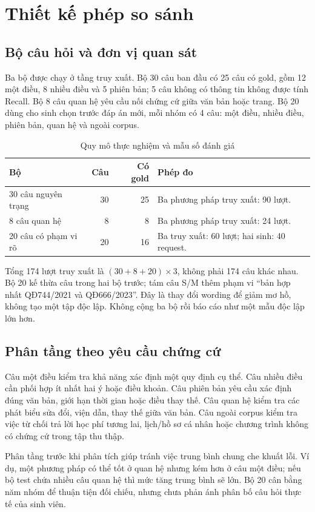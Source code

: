 \section{Thiết kế phép so sánh}
\subsection{Bộ câu hỏi và đơn vị quan sát}
Ba bộ được chạy ở tầng truy xuất. Bộ 30 câu ban đầu có 25 câu có gold, gồm 12 một điều, 8 nhiều điều và 5 phiên bản; 5 câu không có thông tin không được tính Recall. Bộ 8 câu quan hệ yêu cầu nối chứng cứ giữa văn bản hoặc trang. Bộ 20 dùng cho sinh chọn trước đáp án mới, mỗi nhóm có 4 câu: một điều, nhiều điều, phiên bản, quan hệ và ngoài corpus.

\begin{table}[H]
\centering\small
\caption{Quy mô thực nghiệm và mẫu số đánh giá}
\begin{tabularx}{\textwidth}{X r r X}
\toprule Bộ & Câu & Có gold & Phép đo\\
\midrule
30 câu nguyên trạng & 30 & 25 & Ba phương pháp truy xuất: 90 lượt.\\
8 câu quan hệ & 8 & 8 & Ba phương pháp truy xuất: 24 lượt.\\
20 câu có phạm vi rõ & 20 & 16 & Ba truy xuất: 60 lượt; hai sinh: 40 request.\\
\bottomrule
\end{tabularx}
\end{table}

Tổng 174 lượt truy xuất là $(30+8+20)\times3$, không phải 174 câu khác nhau. Bộ 20 kế thừa câu trong hai bộ trước; tám câu S/M thêm phạm vi ``bản hợp nhất QĐ744/2021 và QĐ666/2023''. Đây là thay đổi wording để giảm mơ hồ, không tạo một tập độc lập. Không cộng ba bộ rồi báo cáo như một mẫu độc lập lớn hơn.

\subsection{Phân tầng theo yêu cầu chứng cứ}
Câu một điều kiểm tra khả năng xác định một quy định cụ thể. Câu nhiều điều cần phối hợp ít nhất hai ý hoặc điều khoản. Câu phiên bản yêu cầu xác định đúng văn bản, giới hạn thời gian hoặc điều thay thế. Câu quan hệ kiểm tra các phát biểu sửa đổi, viện dẫn, thay thế giữa văn bản. Câu ngoài corpus kiểm tra việc từ chối trả lời học phí tương lai, lịch/hồ sơ cá nhân hoặc chương trình không có chứng cứ trong tập thu thập.

Phân tầng trước khi phân tích giúp tránh việc trung bình chung che khuất lỗi. Ví dụ, một phương pháp có thể tốt ở quan hệ nhưng kém hơn ở câu một điều; nếu bộ test chứa nhiều câu quan hệ thì mức tăng trung bình sẽ lớn. Bộ 20 cân bằng năm nhóm để thuận tiện đối chiếu, nhưng chưa phản ánh phân bố câu hỏi thực tế của sinh viên.

